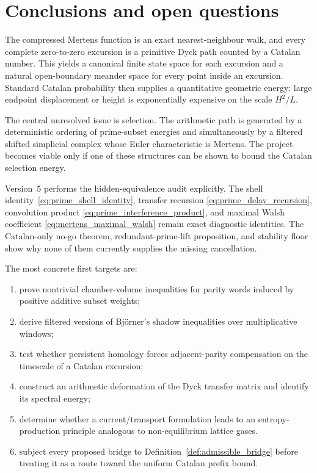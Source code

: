 \documentclass[11pt]{amsart}
\numberwithin{equation}{section}
\theoremstyle{plain}
\theoremstyle{definition}
\theoremstyle{remark}
\begin{document}
\section{Conclusions and open questions}
\label{sec:conclusions}

The compressed Mertens function is an exact nearest-neighbour walk, and every complete zero-to-zero excursion is a primitive Dyck path counted by a Catalan number.  This yields a canonical finite state space for each excursion and a natural open-boundary meander space for every point inside an excursion.  Standard Catalan probability then supplies a quantitative geometric energy: large endpoint displacement or height is exponentially expensive on the scale $H^2/L$.

The central unresolved issue is selection.  The arithmetic path is generated by a deterministic ordering of prime-subset energies and simultaneously by a filtered shifted simplicial complex whose Euler characteristic is Mertens.  The project becomes viable only if one of these structures can be shown to bound the Catalan selection energy.

Version~5 performs the hidden-equivalence audit explicitly.  The shell
identity~\eqref{eq:prime_shell_identity}, transfer recursion
\eqref{eq:prime_delay_recursion}, convolution product
\eqref{eq:prime_interference_product}, and maximal Walsh coefficient
\eqref{eq:mertens_maximal_walsh} remain exact diagnostic identities.  The
Catalan-only no-go theorem, redundant-prime-lift proposition, and stability
floor show why none of them currently supplies the missing cancellation.

The most concrete first targets are:
\begin{enumerate}[label=(\roman*)]
\item prove nontrivial chamber-volume inequalities for parity words induced by positive additive subset weights;
\item derive filtered versions of Bj\"orner's shadow inequalities over multiplicative windows;
\item test whether persistent homology forces adjacent-parity compensation on the timescale of a Catalan excursion;
\item construct an arithmetic deformation of the Dyck transfer matrix and identify its spectral energy;
\item determine whether a current/transport formulation leads to an entropy-production principle analogous to non-equilibrium lattice gases.
\item subject every proposed bridge to Definition~\ref{def:admissible_bridge}
      before treating it as a route toward the uniform Catalan prefix bound.
\end{enumerate}
\end{document}
